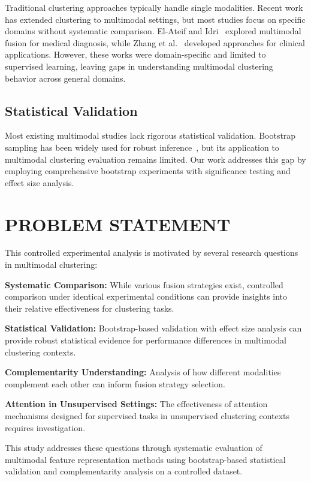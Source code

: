 \documentclass[sigconf]{acmart}
\begin{document}
Traditional clustering approaches typically handle single modalities. Recent work has extended clustering to multimodal settings, but most studies focus on specific domains without systematic comparison. El-Ateif and Idri~\cite{elatief2024multimodality} explored multimodal fusion for medical diagnosis, while Zhang et al.~\cite{zhang2025multimodal} developed approaches for clinical applications. However, these works were domain-specific and limited to supervised learning, leaving gaps in understanding multimodal clustering behavior across general domains.

\subsection{Statistical Validation}

Most existing multimodal studies lack rigorous statistical validation. Bootstrap sampling has been widely used for robust inference~\cite{efron1979bootstrap}, but its application to multimodal clustering evaluation remains limited. Our work addresses this gap by employing comprehensive bootstrap experiments with significance testing and effect size analysis.

\section{PROBLEM STATEMENT}

This controlled experimental analysis is motivated by several research questions in multimodal clustering:

\textbf{Systematic Comparison:} While various fusion strategies exist, controlled comparison under identical experimental conditions can provide insights into their relative effectiveness for clustering tasks.

\textbf{Statistical Validation:} Bootstrap-based validation with effect size analysis can provide robust statistical evidence for performance differences in multimodal clustering contexts.

\textbf{Complementarity Understanding:} Analysis of how different modalities complement each other can inform fusion strategy selection.

\textbf{Attention in Unsupervised Settings:} The effectiveness of attention mechanisms designed for supervised tasks in unsupervised clustering contexts requires investigation.

This study addresses these questions through systematic evaluation of multimodal feature representation methods using bootstrap-based statistical validation and complementarity analysis on a controlled dataset.
\end{document}
